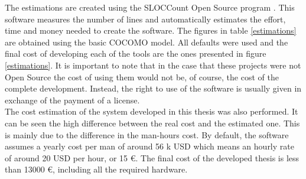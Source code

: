 \begin{appendices}
\begin{table}[H]
\end{table}


		The estimations are created using the SLOCCount Open Source program \cite{sloccount}. 
		This software measures the number of lines and automatically estimates the effort, time and money needed to create the software. 
		The figures in table \ref{estimations} are obtained using the basic COCOMO model. 
		All defaults were used and the final cost of developing each of the tools are the ones presented in figure \ref{estimations}. 
		It is important to note that in the case that these projects were not Open Source the cost of using them would not be, of course, the cost of the complete development. 
		Instead, the right to use of the software is usually given in exchange of the payment of a license. 
		\\

		The cost estimation of the system developed in this thesis was also performed. 
		It can be seen the high difference between the real cost and the estimated one. 
		This is mainly due to the difference in the man-hours cost. 
		By default, the software assumes a yearly cost per man of around 56 k USD which means an hourly rate of around 20 USD per hour, or 15 \euro. 
		The final cost of the developed thesis is less than 13000 \euro, including all the required hardware. 

\end{appendices}